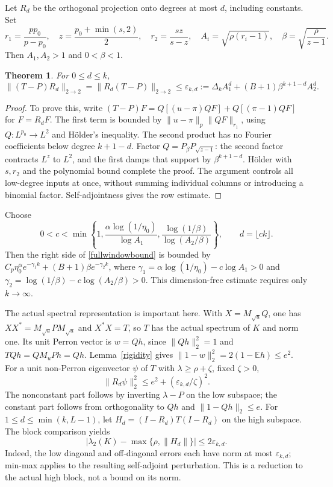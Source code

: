 \documentclass[11pt]{article}
\newcommand{\E}{\mathbb E}
\newtheorem{theorem}{Theorem}[section]
\begin{document}
Let $R_d$ be the orthogonal projection onto degrees at most $d$, including
constants. Set
\[
 r_1=\frac{pp_0}{p-p_0},\quad
 z=\frac{p_0+\min(s,2)}2,\quad r_2=\frac{sz}{s-z},\quad
 A_i=\sqrt{\rho(r_i-1)},\quad \beta=\sqrt{\frac\rho{z-1}}.
\]
Then $A_1,A_2>1$ and $0<\beta<1$. \begin{theorem}\label{fullwindow}
For $0\le d\le k$,
\begin{equation}\label{fullwindowbound}
 \|(T-P)R_d\|_{2\to2}=\|R_d(T-P)\|_{2\to2}
 \le\varepsilon_{k,d}
 :=\Delta_k A_1^d+(B+1)\beta^{k+1-d}A_2^d.
\end{equation}
\end{theorem}
\begin{proof}
To prove this, write
$(T-P)F=Q[(u-\pi)QF]+Q[(\pi-1)QF]$ for $F=R_dF$.
The first term is bounded by $\|u-\pi\|_p\|QF\|_{r_1}$,
using $Q:L^{p_0}\to L^2$ and H\"older's inequality.
The second product has no Fourier coefficients below degree $k+1-d$.
Factor $Q=P_\beta P_{\sqrt{z-1}}$: the second factor contracts
$L^z$ to $L^2$, and the first damps that support by
$\beta^{k+1-d}$. H\"older with $s,r_2$ and the polynomial bound
complete the proof. The argument controls all low-degree inputs at once,
without summing individual columns or introducing a binomial factor.
Self-adjointness gives the row estimate.
\end{proof}

Choose
\[
 0<c<\min\left\{1,
 \frac{\alpha\log(1/\eta_0)}{\log A_1},
 \frac{\log(1/\beta)}{\log(A_2/\beta)}\right\},\qquad d=\lfloor ck\rfloor.
\]
Then the right side of \eqref{fullwindowbound} is bounded by
$C_p\eta_0^\alpha e^{-\gamma_1k}+(B+1)\beta e^{-\gamma_2k}$,
where $\gamma_1=\alpha\log(1/\eta_0)-c\log A_1>0$ and
$\gamma_2=\log(1/\beta)-c\log(A_2/\beta)>0$.
This dimension-free estimate requires only $k\to\infty$.

The actual spectral representation is important here. With
$X=M_{\sqrt u}Q$, one has $XX^*=M_{\sqrt u}PM_{\sqrt u}$ and
$X^*X=T$, so $T$ has the actual spectrum of $K$ and norm one.
Its unit Perron vector is $w=Qh$, since $\|Qh\|_2^2=1$ and
$TQh=QM_uPh=Qh$. Lemma~\ref{rigidity} gives
$\|1-w\|_2^2=2(1-\E h)\le e^2$.
For a unit non-Perron eigenvector $\psi$ of $T$ with
$\lambda\ge\rho+\zeta$, fixed $\zeta>0$,
\[
 \|R_d\psi\|_2^2\le e^2+(\varepsilon_{k,d}/\zeta)^2.
\]
The nonconstant part follows by inverting $\lambda-P$ on the low
subspace; the constant part follows from orthogonality to $Qh$ and
$\|1-Qh\|_2\le e$. For $1\le d\le\min(k,L-1)$, let
$H_d=(I-R_d)T(I-R_d)$ on the high subspace. The block comparison yields
\[
 \left|\lambda_2(K)-\max\{\rho,\|H_d\|\}\right|
 \le2\varepsilon_{k,d}.
\]
Indeed, the low diagonal and off-diagonal errors each have norm at most
$\varepsilon_{k,d}$; min-max applies to the resulting self-adjoint
perturbation. This is a reduction to the actual high block, not a bound
on its norm.
\end{document}
